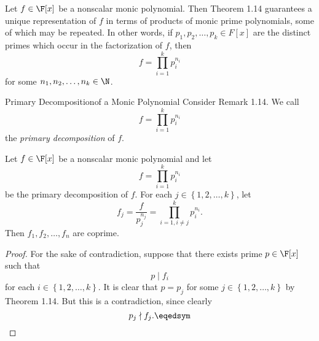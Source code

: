 \documentclass[linearalgebraII]{subfiles}
\begin{document}
    \begin{remark}
        Let $f\in\F[x]$ be a nonscalar monic polynomial. Then Theorem 1.14 guarantees a unique representation of $f$ in terms of products of monic prime polynomials, some of which may be repeated. In other words, if $p_1,p_2,\ldots,p_k\in F[x]$ are the distinct primes which occur in the factorization of $f$, then
        \begin{equation*}
            f = \prod^{k}_{i=1} p_i^{n_i}
        \end{equation*}
        for some $n_1,n_2,\ldots,n_k\in\N$. 
    \end{remark}

    \begin{definition}{Primary Decomposition}{of a Monic Polynomial}
        Consider Remark 1.14. We call
        \begin{equation*}
            f = \prod^{k}_{i=1} p_i^{n_i}
        \end{equation*}
        the \emph{primary decomposition} of $f$.
    \end{definition}

    \begin{prop}{}
        Let $f\in\F[x]$ be a nonscalar monic polynomial and let
        \begin{equation*}
            f = \prod^{k}_{i=1} p_i^{n_i}
        \end{equation*}
        be the primary decomposition of $f$. For each $j\in\left\lbrace 1,2,\ldots,k \right\rbrace$, let
        \begin{equation*}
            f_j = \frac{f}{p_j^{n_j}} = \prod^{k}_{i=1,i\neq j} p_i^{n_i} .
        \end{equation*}
        Then $f_1,f_2,\ldots,f_n$ are coprime.
    \end{prop}

    \begin{proof}
        For the sake of contradiction, suppose that there exists prime $p\in\F[x]$ such that
        \begin{equation*}
            p\mid f_i
        \end{equation*}
        for each $i\in\left\lbrace 1,2,\ldots,k \right\rbrace$. It is clear that $p=p_j$ for some $j\in\left\lbrace 1,2,\ldots,k \right\rbrace$ by Theorem 1.14. But this is a contradiction, since clearly
        \begin{equation*}
            p_j\nmid f_j. \eqedsym
        \end{equation*}
    \end{proof}
\end{document}
